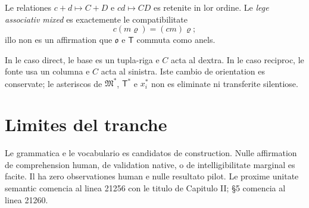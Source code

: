 \documentclass[11pt]{article}
\begin{document}
Le relationes $c+d\mapsto C+D$ e $cd\mapsto CD$ es retenite in lor ordine. Le \emph{lege associativ mixed} es exactemente le compatibilitate
\[
c(m\varrho)=(cm)\varrho;
\]
illo non es un affirmation que $\mathfrak{o}$ e $\mathsf T$ commuta como anels.

In le caso direct, le base es un tupla-riga e $C$ acta al dextra. In le caso reciproc, le fonte usa un columna e $C$ acta al sinistra. Iste cambio de orientation es conservate; le asteriscos de $\mathfrak M^*$, $\mathsf T^*$ e $x_i^*$ non es eliminate ni transferite silentiose.

\section*{Limites del tranche}

Le grammatica e le vocabulario es candidatos de construction. Nulle affirmation de comprehension human, de validation native, o de intelligibilitate marginal es facite. Il ha zero observationes human e nulle resultato pilot. Le proxime unitate semantic comencia al linea 21256 con le titulo de Capitulo II; §5 comencia al linea 21260.
\end{document}
